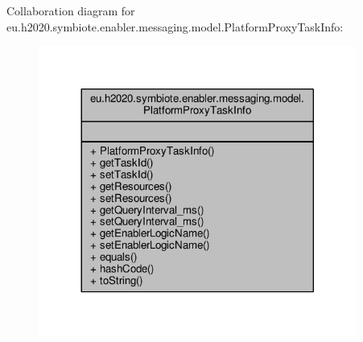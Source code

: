Collaboration diagram for eu.\+h2020.\+symbiote.\+enabler.\+messaging.\+model.\+Platform\+Proxy\+Task\+Info\+:
\nopagebreak
\begin{figure}[H]
\begin{center}
\leavevmode
\includegraphics[width=296pt]{classeu_1_1h2020_1_1symbiote_1_1enabler_1_1messaging_1_1model_1_1PlatformProxyTaskInfo__coll__graph}
\end{center}
\end{figure}
